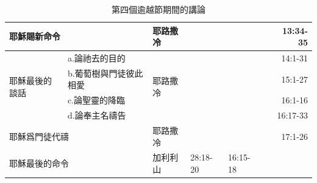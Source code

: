 \begin{table}[htbp]
\begin{tabular}{|p{4.57em}l|p{4.43em}|p{4.215em}|p{4.355em}|r|r|}
    \midrule
    \multicolumn{2}{|p{17.285em}|}{耶穌賜新命令} & 耶路撒冷  & \multicolumn{1}{r|}{} & \multicolumn{1}{r|}{} &       & \multicolumn{1}{p{5.93em}|}{13:34-35} \\
    \midrule
    \multicolumn{1}{|l|}{\multirow{4}{*}{\parbox{0.08\textwidth}{耶穌最後的談話}}} & \multicolumn{1}{p{12.715em}|}{a.論祂去的目的} & \multirow{4}[8]{*}{耶路撒冷} & \multicolumn{1}{r|}{} & \multicolumn{1}{r|}{} &       & \multicolumn{1}{p{5.93em}|}{14:1-31} \\
\cmidrule{2-2}\cmidrule{4-7}    \multicolumn{1}{|l|}{} & \multicolumn{1}{p{12.715em}|}{b.葡萄樹與門徒彼此相愛} & \multicolumn{1}{c|}{} & \multicolumn{1}{r|}{} & \multicolumn{1}{r|}{} &       & \multicolumn{1}{p{5.93em}|}{15:1-27} \\
\cmidrule{2-2}\cmidrule{4-7}    \multicolumn{1}{|l|}{} & \multicolumn{1}{p{12.715em}|}{c.論聖靈的降臨} & \multicolumn{1}{c|}{} & \multicolumn{1}{r|}{} & \multicolumn{1}{r|}{} &       & \multicolumn{1}{p{5.93em}|}{16:1-16} \\
\cmidrule{2-2}\cmidrule{4-7}    \multicolumn{1}{|l|}{} & \multicolumn{1}{p{12.715em}|}{d.論奉主名禱告} & \multicolumn{1}{c|}{} & \multicolumn{1}{r|}{} & \multicolumn{1}{r|}{} &       & \multicolumn{1}{p{5.93em}|}{16:17-33} \\
    \midrule
    \multicolumn{2}{|p{17.285em}|}{耶穌爲門徒代禱} & 耶路撒冷  & \multicolumn{1}{r|}{} & \multicolumn{1}{r|}{} &       & \multicolumn{1}{p{5.93em}|}{17:1-26} \\
    \midrule
    \multicolumn{2}{|p{17.285em}|}{耶穌最後的命令} & 加利利山  & 28:18-20 & 16:15-18 &       &  \\
    \bottomrule
    \end{tabular}%
     \caption{第四個逾越節期間的講論}
  \label{tab:addlabel}%
\end{table}%
